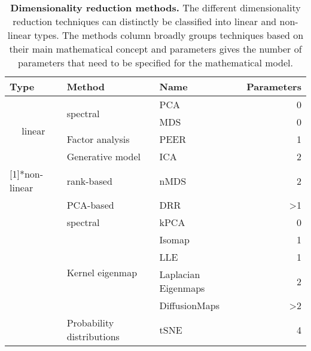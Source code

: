 \begin{table}[htbp]
  \centering
  \caption[\textbf{Dimensionality reduction methods.}]{\textbf{Dimensionality reduction methods.} The different dimensionality reduction techniques can distinctly be classified into linear and non-linear types. The methods column broadly groups techniques based on their main mathematical concept and parameters gives the number of parameters that need to be specified for the mathematical model.}
    \begin{tabular}{lllr}
    \toprule
    Type  & Method & Name  & \multicolumn{1}{l}{Parameters} \\
    \midrule
    \multicolumn{1}{c}{\multirow{4}[1]{*}{linear}} & \multirow{2}[1]{*}{spectral} & PCA   & 0 \\
          &       & MDS   & 0 \\
    \addlinespace[1.5ex]
          & Factor analysis & PEER  & 1 \\
          & Generative model & ICA   & 2 \\
    \addlinespace[0.5ex]
    \midrule
    \addlinespace[1ex]
    \multirow{8}[1]{*}{non-linear} & rank-based & nMDS  & 2 \\
          & PCA-based & DRR   & >1 \\
    \addlinespace[1.5ex]
          & spectral & kPCA  & 0 \\
          &  \multirow{4}[0]{*}{Kernel eigenmap}      & Isomap & 1 \\
          &       & LLE   & 1 \\
          &       & Laplacian Eigenmaps & 2 \\
          &       & DiffusionMaps & >2 \\
    \addlinespace[1.5ex]
          & Probability distributions & tSNE  & 4 \\
    \bottomrule
    \end{tabular}%
\label{tab:dimMethods}%
\end{table}%

